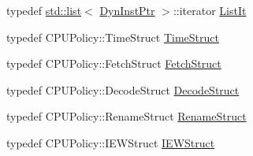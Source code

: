 \begin{DoxyCompactItemize}
\item 
typedef \hyperlink{classstd_1_1list}{std::list}$<$ \hyperlink{classFullO3CPU_a028ce10889c5f6450239d9e9a7347976}{DynInstPtr} $>$::iterator \hyperlink{classFullO3CPU_a184cb829e22cc656acb41864f68f51ea}{ListIt}
\item 
typedef CPUPolicy::TimeStruct \hyperlink{classFullO3CPU_aa6c328aeb664577b61817285d04f3631}{TimeStruct}
\item 
typedef CPUPolicy::FetchStruct \hyperlink{classFullO3CPU_ae885ff43c757f445563029fd15cdf70c}{FetchStruct}
\item 
typedef CPUPolicy::DecodeStruct \hyperlink{classFullO3CPU_ae7f8b193f518ed524a498ef7ab564902}{DecodeStruct}
\item 
typedef CPUPolicy::RenameStruct \hyperlink{classFullO3CPU_a494521ebae1f8b01fe0ed16320494e6a}{RenameStruct}
\item 
typedef CPUPolicy::IEWStruct \hyperlink{classFullO3CPU_a8ca44c33753253e21ca215123e8b5005}{IEWStruct}
\end{DoxyCompactItemize}

